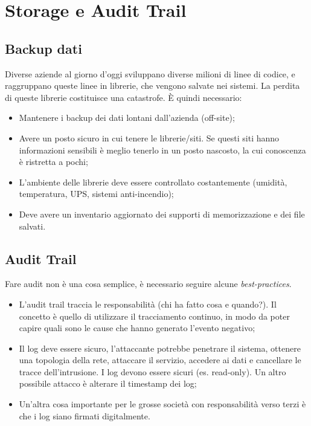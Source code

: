 \section{Storage e Audit Trail}
\label{sat}

\subsection{Backup dati}

Diverse aziende al giorno d'oggi sviluppano diverse milioni di linee di codice,
e raggruppano queste linee in librerie, che vengono salvate nei sistemi. La
perdita di queste librerie costituisce una catastrofe. È quindi necessario:
\begin{itemize}
  \item Mantenere i backup dei dati lontani dall'azienda (off-site);
  \item Avere un posto sicuro in cui tenere le librerie/siti. Se questi siti
  hanno informazioni sensibili è meglio tenerlo in un posto nascosto, la cui
  conoscenza è ristretta a pochi;
  \item L'ambiente delle librerie deve essere controllato costantemente
(umidità, temperatura, UPS, sistemi anti-incendio);  \item Deve avere un
inventario aggiornato dei supporti di memorizzazione e
  dei file salvati.


\end{itemize}

\subsection{Audit Trail}

Fare audit non è una cosa semplice, è necessario seguire alcune
\textit{best-practices}.

\begin{itemize}
 \item L'audit trail traccia le responsabilità (chi ha fatto cosa e quando?).
 Il concetto è quello di utilizzare il tracciamento continuo, in modo da poter
 capire quali sono le cause che hanno generato l'evento negativo;
 \item Il log deve essere sicuro, l'attaccante potrebbe penetrare il sistema,
 ottenere una topologia della rete, attaccare il servizio, accedere ai dati e
 cancellare le tracce dell'intrusione. I log devono essere sicuri (es.
 read-only). Un altro possibile attacco è alterare il timestamp dei log;
 \item Un'altra cosa importante per le grosse società con responsabilità verso
 terzi è che i log siano firmati digitalmente.

\end{itemize}

